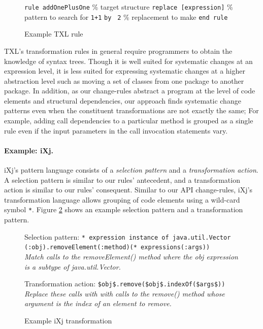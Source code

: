 \documentclass[runningheads,a4paper]{llncs}
\newcommand{\codefont}[1]{\footnotesize{\texttt{#1}}\normalsize}
\begin{document}
\begin{figure} 
\codefont{rule addOnePlusOne} \% target structure \newline
\indent \codefont{replace [expression]}  \% pattern to search for \newline
\indent \indent \codefont{1+1} \newline
\indent \codefont{by } 
\indent \indent \codefont{2} \newline \% replacement to make \newline
\codefont{end rule} \newline
\caption{Example TXL rule} 
\label{txl_rule} 
\end{figure} 

TXL's transformation rules in general require programmers to obtain the knowledge of syntax trees. Though it is well suited for systematic changes at an expression level, it is less suited for expressing systematic changes at a higher abstraction level such as moving a set of classes from one package to another package. In addition, as our change-rules abstract a program at the level of code elements and structural dependencies, our approach finds systematic change patterns even when the constituent transformations are not exactly the same; For example, adding call dependencies to a particular method is grouped as a single rule even if the input parameters in the call invocation statements vary. 

\paragraph{\textbf{Example: iXj.}} 
iXj's pattern language consists of a {\em selection pattern} and a {\em transformation action}. A selection pattern is similar to our rules' antecedent, and a transformation action is similar to our rules' consequent. Similar to our API change-rules, iXj's transformation language allows grouping of code elements using a wild-card symbol \codefont{*}. Figure \ref{ixj_example} shows an example selection pattern and a transformation pattern. 

\begin{figure} 
Selection pattern: \codefont{* expression instance of java.util.Vector (:obj).removeElement(:method)(* expressions(:args))} \\
\it{Match calls to the {removeElement()} method where the {obj} expression is a subtype of {java.util.Vector}.} 

Transformation action: \codefont{\$obj\$.remove(\$obj\$.indexOf(\$args\$))} \\
\it{Replace these calls with with calls to the {remove()} method whose argument is the index of an element to remove.} 

\caption{Example iXj transformation} 
\label{ixj_example} 
\end{figure} 
\end{document}
